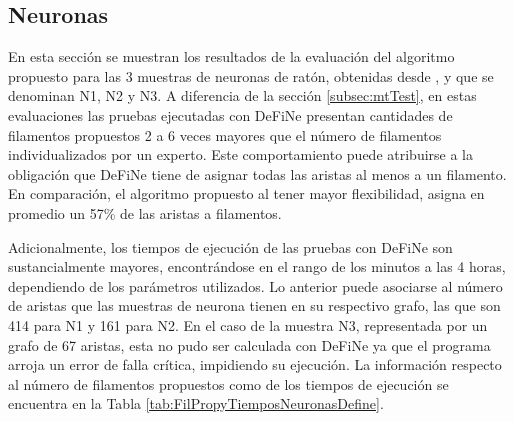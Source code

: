 \clearpage
\newpage

\subsection{Neuronas}
\label{subsec:neuronTest}
En esta secci\'on se muestran los resultados de la evaluaci\'on del algoritmo propuesto para las 3 muestras de neuronas de rat\'on, obtenidas desde \cite{ampuero2019chronic}, y que se denominan N1, N2 y N3. A diferencia de la secci\'on \ref{subsec:mtTest}, en estas evaluaciones las pruebas ejecutadas con DeFiNe presentan cantidades de filamentos propuestos 2 a 6 veces mayores que el n\'umero de filamentos individualizados por un experto. Este comportamiento puede atribuirse a la obligaci\'on que DeFiNe tiene de asignar todas las aristas al menos a un filamento. En comparaci\'on, el algoritmo propuesto al tener mayor flexibilidad, asigna en promedio un 57\% de las aristas a filamentos.

Adicionalmente, los tiempos de ejecuci\'on de las pruebas con DeFiNe son sustancialmente mayores, encontr\'andose en el rango de los minutos a las 4 horas, dependiendo de los par\'ametros utilizados. Lo anterior puede asociarse al n\'umero de aristas que las muestras de neurona tienen en su respectivo grafo, las que son 414 para N1 y 161 para N2. En el caso de la muestra N3, representada por un grafo de 67 aristas, esta no pudo ser calculada con DeFiNe ya que el programa arroja un error de falla cr\'itica, impidiendo su ejecuci\'on. La informaci\'on respecto al n\'umero de filamentos propuestos como de los tiempos de ejecuci\'on se encuentra en la Tabla \ref{tab:FilPropyTiemposNeuronasDefine}.

